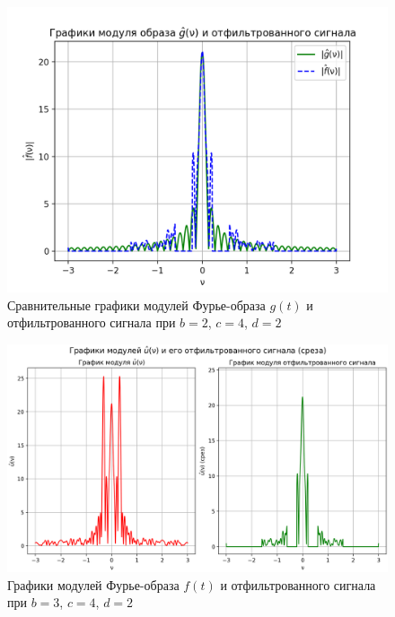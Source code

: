 \begin{figure}[ht!]
    \centering
    \includegraphics[scale=0.55]{media/1 task/specific_freq/Fourier_Image_Comparison_2_4_2_-0,6_-0,22_-2,99_-1,6.png}
    \caption{Сравнительные графики модулей Фурье-образа $g(t)$ и отфильтрованного сигнала при $b=2$,  $c=4$,  $d=2$}
    \label{fig:fourc_2_4_2}
\end{figure}



\begin{figure}[ht!]
    \centering
    \includegraphics[scale=0.55]{media/1 task/specific_freq/Fourier_Image_3_4_2_-0,6_-0,22_-2,99_-1,6.png}
    \caption{Графики модулей Фурье-образа $f(t)$ и отфильтрованного сигнала при $b=3$,  $c=4$,  $d=2$}
    \label{fig:four_3_4_2}
\end{figure}

